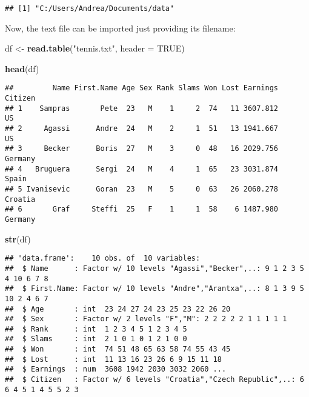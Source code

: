 \documentclass[]{book}
\newenvironment{Shaded}{\begin{snugshade}}{\end{snugshade}}
\newcommand{\KeywordTok}[1]{\textcolor[rgb]{0.13,0.29,0.53}{\textbf{{#1}}}}
\newcommand{\DataTypeTok}[1]{\textcolor[rgb]{0.13,0.29,0.53}{{#1}}}
\newcommand{\StringTok}[1]{\textcolor[rgb]{0.31,0.60,0.02}{{#1}}}
\newcommand{\OtherTok}[1]{\textcolor[rgb]{0.56,0.35,0.01}{{#1}}}
\newcommand{\NormalTok}[1]{{#1}}
\begin{document}
\begin{verbatim}
## [1] "C:/Users/Andrea/Documents/data"
\end{verbatim}

Now, the text file can be imported just providing its filename:

\begin{Shaded}
\begin{Highlighting}[]
\NormalTok{df <-}\StringTok{ }\KeywordTok{read.table}\NormalTok{(}\StringTok{"tennis.txt"}\NormalTok{, }\DataTypeTok{header =} \OtherTok{TRUE}\NormalTok{)}
\end{Highlighting}
\end{Shaded}

\begin{Shaded}
\begin{Highlighting}[]
\KeywordTok{head}\NormalTok{(df)}
\end{Highlighting}
\end{Shaded}

\begin{verbatim}
##         Name First.Name Age Sex Rank Slams Won Lost Earnings Citizen
## 1    Sampras       Pete  23   M    1     2  74   11 3607.812      US
## 2     Agassi      Andre  24   M    2     1  51   13 1941.667      US
## 3     Becker      Boris  27   M    3     0  48   16 2029.756 Germany
## 4   Bruguera      Sergi  24   M    4     1  65   23 3031.874   Spain
## 5 Ivanisevic      Goran  23   M    5     0  63   26 2060.278 Croatia
## 6       Graf     Steffi  25   F    1     1  58    6 1487.980 Germany
\end{verbatim}

\begin{Shaded}
\begin{Highlighting}[]
\KeywordTok{str}\NormalTok{(df)}
\end{Highlighting}
\end{Shaded}

\begin{verbatim}
## 'data.frame':    10 obs. of  10 variables:
##  $ Name      : Factor w/ 10 levels "Agassi","Becker",..: 9 1 2 3 5 4 10 6 7 8
##  $ First.Name: Factor w/ 10 levels "Andre","Arantxa",..: 8 1 3 9 5 10 2 4 6 7
##  $ Age       : int  23 24 27 24 23 25 23 22 26 20
##  $ Sex       : Factor w/ 2 levels "F","M": 2 2 2 2 2 1 1 1 1 1
##  $ Rank      : int  1 2 3 4 5 1 2 3 4 5
##  $ Slams     : int  2 1 0 1 0 1 2 1 0 0
##  $ Won       : int  74 51 48 65 63 58 74 55 43 45
##  $ Lost      : int  11 13 16 23 26 6 9 15 11 18
##  $ Earnings  : num  3608 1942 2030 3032 2060 ...
##  $ Citizen   : Factor w/ 6 levels "Croatia","Czech Republic",..: 6 6 4 5 1 4 5 5 2 3
\end{verbatim}
\end{document}
